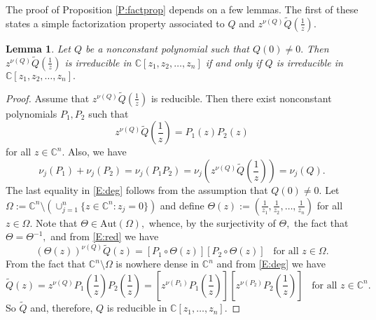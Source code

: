 \documentclass[11pt, reqno]{amsart}
\numberwithin{equation}{section}
\theoremstyle{definition}
\theoremstyle{remark}
\theoremstyle{plain}
\newtheorem{lemma}[definition]{Lemma}
\begin{document}
The proof of Proposition \ref{P:factprop} depends on a few lemmas. The first of these
states a simple factorization property associated to 
$Q$ and $z^{\nu(Q)}\widetilde{Q}(\frac{1}{z}).$

\begin{lemma}\label{L:conirr}
Let $Q$ be a nonconstant polynomial such that $Q(0)\not =0.$
Then $z^{\nu(Q)}\widetilde{Q}(\frac{1}{z})$ is irreducible 
in ${\mathbb{C}}[z_1,z_2,\ldots,z_n]$ if and only if $Q$ is irreducible in ${\mathbb{C}}[z_1,z_2,\ldots,z_n].$
\end{lemma}
\begin{proof}
Assume that $z^{\nu(Q)}\widetilde{Q}(\frac{1}{z})$ is reducible. Then there exist
nonconstant polynomials $P_1,P_2$ such that
\begin{equation}
z^{\nu(Q)}\widetilde{Q}\left(\frac{1}{z}\right)=P_1(z)P_2(z)\label{E:red}
\end{equation}
for all $z\in{\mathbb{C}^n}.$ Also, we have 
\begin{equation}
\nu_{j}(P_1)+\nu_{j}(P_2)=\nu_{j}(P_1P_2)
=\nu_{j}\left(z^{\nu(Q)}\widetilde{Q}\left(\frac{1}{z}\right)\right)
=\nu_{j}(Q).\label{E:deg}
\end{equation}
The last equality in \eqref{E:deg} follows from the assumption that $Q(0)\neq 0.$
Let ${\Omega}:={\mathbb{C}^n}\setminus(\cup_{j=1}^{n}\{z\in{\mathbb{C}^n}:z_j=0\})$ and define
$\Theta(z):=(\frac{1}{z_1},\frac{1}{z_2},\ldots,\frac{1}{z_n})$ for all $z\in{\Omega}.$
Note that $\Theta\in\text{Aut}({\Omega}),$ whence, by the surjectivity of $\Theta,$
the fact that $\Theta=\Theta^{-1},$ and from \eqref{E:red} we have
\[
\left(\Theta(z)\right)^{\nu(Q)}\widetilde{Q}(z)=\left[P_1\circ\Theta(z)\right]
\left[P_2\circ\Theta(z)\right]\;\;\;\text{for all $z\in{\Omega}$.}
\]
From the fact that ${\mathbb{C}^n}\setminus{\Omega}$ is nowhere dense in ${\mathbb{C}^n}$ and from \eqref{E:deg} we have
\[
\widetilde{Q}(z)=z^{\nu(Q)}P_1\left(\frac{1}{z}\right)P_2\left(\frac{1}{z}\right)
=\left[z^{\nu(P_1)}P_1\left(\frac{1}{z}\right)\right]
\left[z^{\nu(P_2)}P_2\left(\frac{1}{z}\right)\right]\;\;\;\text{for all $z\in{\mathbb{C}}^n$.}
\]
So $\widetilde{Q}$ and, therefore, $Q$ is reducible in ${\mathbb{C}}[z_1,\ldots,z_n].$
\smallskip


\end{proof}
\end{document}
